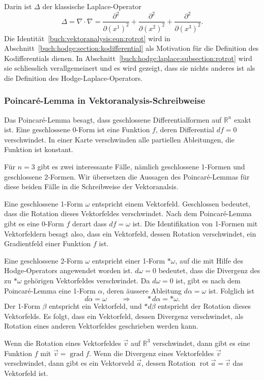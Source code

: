 \egroup
Darin ist $\Delta$ der klassische Laplace-Operator
%
\[
\Delta
=
\nabla\cdot\nabla
=
\frac{\partial^2}{\partial (x^1)^2}
+
\frac{\partial^2}{\partial (x^2)^2}
+
\frac{\partial^2}{\partial (x^3)^2}.
\]
Die Identität~\eqref{buch:vektoranalysis:eqn:rotrot} wird in
Abschnitt~\ref{buch:hodge:section:kodifferential} als Motivation
für die Definition des Kodifferentials dienen.
In Abschnitt~\ref{buch:hodge:laplace:subsection:rotrot} wird sie
schliesslich verallgemeinert und es wird gezeigt, dass sie nichts
anderes ist als die Definition des Hodge-Laplace-Operators.

%
%
\subsubsection{Poincaré-Lemma in Vektoranalysis-Schreibweise}
Das Poincaré-Lemma besagt, dass geschlossene Differentialformen auf
$\mathbb{R}^n$ exakt ist.
Eine geschlossene 0-Form ist eine Funktion $f$, deren Differential
$df=0$ verschwindet.
In einer Karte verschwinden alle partiellen Ableitungen, die Funktion
ist konstant.

Für $n=3$ gibt es zwei interessante Fälle, nämlich geschlossene 1-Formen
und geschlossene 2-Formen.
Wir übersetzen die Aussagen des Poincaré-Lemmas für diese beiden
Fälle in die Schreibweise der Vektoranalsis.

Eine geschlossene 1-Form $\omega$ entspricht einem Vektorfeld.
Geschlossen bedeutet, dass die Rotation dieses Vektorfeldes verschwindet.
Nach dem Poincaré-Lemma gibt es eine 0-Form $f$ derart dass
%
$df=\omega$ ist.
Die Identifikation von 1-Formen mit Vektorfeldern besagt also, dass
ein Vektorfeld, dessen Rotation verschwindet, ein Gradientfeld
einer Funktion $f$ ist.

Eine geschlossene 2-Form $\omega$ entspricht einer 1-Form $\ast\omega$,
auf die mit Hilfe des Hodge-Operators angewendet worden ist.
$d\omega=0$ bedeutet, dass die Divergenz des zu $\ast\omega$
gehörigen Vektorfeldes verschwindet.
Da $d\omega=0$ ist, gibt es nach dem Poincaré-Lemma eine 1-Form $\alpha$,
deren äussere Ableitung $d\alpha=\omega$ ist.
Folglich ist 
\[
d\alpha = \omega
\qquad\Rightarrow\qquad
\ast d\alpha = \ast\omega.
\]
Der 1-Form $\beta$ entspricht ein Vektorfeld, und $\ast d\beta$ entspricht
der Rotation dieses Vektorfelds.
Es folgt, dass ein Vektorfeld, dessen Divergenz verschwindet, als
Rotation eines anderen Vektorfeldes geschrieben werden kann.

\begin{satz}
Wenn die Rotation eines Vektorfeldes $\vec{v}$ auf $\mathbb{R}^3$
verschwindet, dann gibt es eine Funktion $f$ mit
$\vec{v}=\operatorname{grad}f$.
Wenn die Divergenz eines Vektorfeldes $\vec{v}$ verschwindet,
dann gibt es ein Vektorveld $\vec{a}$, dessen Rotation
$\operatorname{rot}\vec{a}=\vec{v}$ das Vektorfeld ist.
\end{satz}

